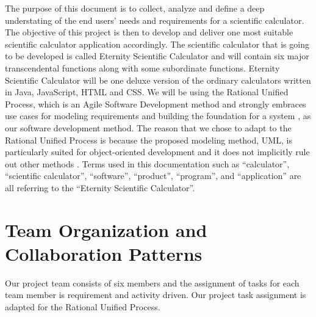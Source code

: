\documentclass[12pt]{article}
\begin{document}
The purpose of this document is to collect, analyze and define a deep understating of the end
users’ needs and requirements for a scientific calculator. The objective of this project is then
to develop and deliver one most suitable scientific calculator application accordingly.\newline\newline
The scientific calculator that is going to be developed is called Eternity Scientific Calculator and will contain six major transcendental functions along with some subordinate functions.\newline\newline
Eternity Scientific Calculator will be one deluxe version of the ordinary calculators written in Java, JavaScript, HTML and CSS.\newline\newline
We will be using the Rational Unified Process, which is an Agile Software Development method and strongly embraces use cases for modeling requirements and building the foundation for a system \cite{abrahamsson2017agile}, as our software development method.\newline\newline
The reason that we chose to adapt to the Rational Unified Process is because the proposed modeling method, UML, is particularly suited for object-oriented development and it does not implicitly rule out other methods \cite{jacobson1993object}.\newline\newline
Terms used in this documentation such as “calculator”, “scientific calculator”, “software”, “product”, “program”, and “application” are all referring to the “Eternity Scientific Calculator”.

\newpage
\section{Team Organization and Collaboration Patterns}
Our project team consists of six members and the assignment of tasks for each team member is requirement and activity driven. Our project task assignment is adapted for the Rational Unified Process.
\end{document}
